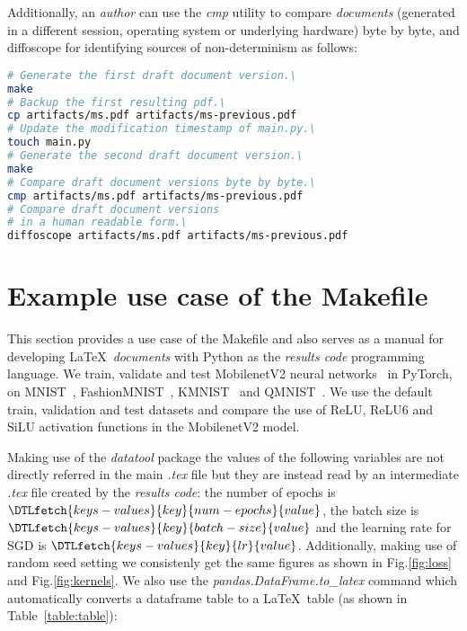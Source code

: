 \documentclass[journal]{IEEEtran}
\begin{document}
Additionally, an \textit{author} can use the \textit{cmp} utility to compare \textit{documents} (generated in a different session, operating system or underlying hardware) byte by byte, and diffoscope for identifying sources of non-determinism as follows:
\begin{lstlisting}[language=bash, style=lststyle, caption={Test draft document version reproducibility. This can also be used as a test script when pushing or pull requesting to a remote repository.}]
# Generate the first draft document version.\ 
make
# Backup the first resulting pdf.\ 
cp artifacts/ms.pdf artifacts/ms-previous.pdf
# Update the modification timestamp of main.py.\ 
touch main.py
# Generate the second draft document version.\ 
make
# Compare draft document versions byte by byte.\ 
cmp artifacts/ms.pdf artifacts/ms-previous.pdf
# Compare draft document versions
# in a human readable form.\ 
diffoscope artifacts/ms.pdf artifacts/ms-previous.pdf
\end{lstlisting}

\section{Example use case of the Makefile}
This section provides a use case of the Makefile and also serves as a manual for developing \LaTeX\ \textit{documents} with Python as the \textit{results code} programming language.
We train, validate and test MobilenetV2 neural networks~\cite{sandler2018mobilenetv2} in PyTorch, on MNIST~\cite{lecun2010mnist}, FashionMNIST~\cite{xiao2017fashion}, KMNIST~\cite{clanuwat2018deep} and QMNIST~\cite{yadav2019cold}.
We use the default train, validation and test datasets and compare the use of ReLU, ReLU6\cite{dahl2013improving} and SiLU\cite{elfwing2018sigmoid} activation functions in the MobilenetV2 model.

Making use of the \textit{datatool} package the values of the following variables are not directly referred in the main \textit{.tex} file but they are instead read by an intermediate \textit{.tex} file created by the \textit{results code}: the number of epochs is $\DTLfetch{keys-values}{key}{num-epochs}{value}$, the batch size is $\DTLfetch{keys-values}{key}{batch-size}{value}$ and the learning rate for SGD is $\DTLfetch{keys-values}{key}{lr}{value}$.
Additionally, making use of random seed setting we consistenly get the same figures as shown in Fig.\ref{fig:loss} and Fig.\ref{fig:kernels}.
We also use the \textit{pandas.DataFrame.to\_latex} command which automatically converts a dataframe table to a \LaTeX\ table (as shown in Table~\ref{table:table}):
\end{document}
